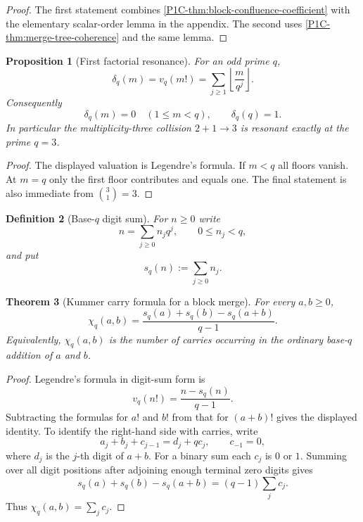 \documentclass[11pt]{article}
\newtheorem{theorem}{Theorem}[section]
\newtheorem{proposition}[theorem]{Proposition}
\newtheorem{definition}[theorem]{Definition}
\theoremstyle{remark}
\begin{document}
\begin{proof}
The first statement combines \cref{P1C-thm:block-confluence-coefficient} with the elementary scalar-order lemma in the appendix.  The second uses \cref{P1C-thm:merge-tree-coherence} and the same lemma.
\end{proof}

\begin{proposition}[First factorial resonance]\label{P1C-prop:first-factorial-resonance}
For an odd prime $q$,
\[
 \delta_q(m)=v_q(m!)
 =\sum_{j\ge1}\left\lfloor\frac{m}{q^j}\right\rfloor.
\]
Consequently
\[
 \boxed{
 \delta_q(m)=0\quad(1\le m<q),
 \qquad
 \delta_q(q)=1.}
\]
In particular the multiplicity-three collision $2+1\to3$ is resonant exactly at the prime $q=3$.
\end{proposition}

\begin{proof}
The displayed valuation is Legendre's formula.  If $m<q$ all floors vanish.  At $m=q$ only the first floor contributes and equals one.  The final statement is also immediate from $\binom31=3$.
\end{proof}

\begin{definition}[Base-$q$ digit sum]\label{P1C-def:base-q-digit-sum}
For $n\ge0$ write
\[
 n=\sum_{j\ge0}n_jq^j,
 \qquad 0\le n_j<q,
\]
and put
\[
 \boxed{s_q(n):=\sum_{j\ge0}n_j.}
\]
\end{definition}

\begin{theorem}[Kummer carry formula for a block merge]\label{P1C-thm:kummer-block-carry}
For every $a,b\ge0$,
\[
 \boxed{
 \chi_q(a,b)
 =\frac{s_q(a)+s_q(b)-s_q(a+b)}{q-1}.}
\]
Equivalently, $\chi_q(a,b)$ is the number of carries occurring in the ordinary base-$q$ addition of $a$ and $b$.
\end{theorem}

\begin{proof}
Legendre's formula in digit-sum form is
\[
 v_q(n!)=\frac{n-s_q(n)}{q-1}.
\]
Subtracting the formulas for $a!$ and $b!$ from that for $(a+b)!$ gives the displayed identity.  To identify the right-hand side with carries, write
\[
 a_j+b_j+c_{j-1}=d_j+qc_j,
 \qquad c_{-1}=0,
\]
where $d_j$ is the $j$-th digit of $a+b$.  For a binary sum each $c_j$ is $0$ or $1$.  Summing over all digit positions after adjoining enough terminal zero digits gives
\[
 s_q(a)+s_q(b)-s_q(a+b)=(q-1)\sum_jc_j.
\]
Thus $\chi_q(a,b)=\sum_jc_j$.
\end{proof}
\end{document}

